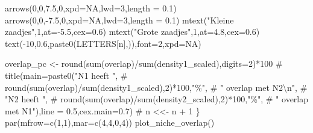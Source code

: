 \documentclass[
  a4paper,
]{scrbook}
\newenvironment{Shaded}{\begin{snugshade}}{\end{snugshade}}
\newcommand{\AttributeTok}[1]{\textcolor[rgb]{0.40,0.45,0.13}{#1}}
\newcommand{\CommentTok}[1]{\textcolor[rgb]{0.37,0.37,0.37}{#1}}
\newcommand{\ConstantTok}[1]{\textcolor[rgb]{0.56,0.35,0.01}{#1}}
\newcommand{\DecValTok}[1]{\textcolor[rgb]{0.68,0.00,0.00}{#1}}
\newcommand{\FloatTok}[1]{\textcolor[rgb]{0.68,0.00,0.00}{#1}}
\newcommand{\FunctionTok}[1]{\textcolor[rgb]{0.28,0.35,0.67}{#1}}
\newcommand{\NormalTok}[1]{\textcolor[rgb]{0.00,0.23,0.31}{#1}}
\newcommand{\OtherTok}[1]{\textcolor[rgb]{0.00,0.23,0.31}{#1}}
\newcommand{\SpecialCharTok}[1]{\textcolor[rgb]{0.37,0.37,0.37}{#1}}
\newcommand{\StringTok}[1]{\textcolor[rgb]{0.13,0.47,0.30}{#1}}
\theoremstyle{definition}
\theoremstyle{remark}
\begin{document}
\begin{Shaded}
\begin{Highlighting}[]
  \FunctionTok{arrows}\NormalTok{(}\DecValTok{0}\NormalTok{,}\DecValTok{0}\NormalTok{,}\FloatTok{7.5}\NormalTok{,}\DecValTok{0}\NormalTok{,}\AttributeTok{xpd=}\ConstantTok{NA}\NormalTok{,}\AttributeTok{lwd=}\DecValTok{3}\NormalTok{,}\AttributeTok{length =} \FloatTok{0.1}\NormalTok{)}
  \FunctionTok{arrows}\NormalTok{(}\DecValTok{0}\NormalTok{,}\DecValTok{0}\NormalTok{,}\SpecialCharTok{{-}}\FloatTok{7.5}\NormalTok{,}\DecValTok{0}\NormalTok{,}\AttributeTok{xpd=}\ConstantTok{NA}\NormalTok{,}\AttributeTok{lwd=}\DecValTok{3}\NormalTok{,}\AttributeTok{length =} \FloatTok{0.1}\NormalTok{)}
  \FunctionTok{mtext}\NormalTok{(}\StringTok{"Kleine zaadjes"}\NormalTok{,}\DecValTok{1}\NormalTok{,}\AttributeTok{at=}\SpecialCharTok{{-}}\FloatTok{5.5}\NormalTok{,}\AttributeTok{cex=}\FloatTok{0.6}\NormalTok{)}
  \FunctionTok{mtext}\NormalTok{(}\StringTok{"Grote zaadjes"}\NormalTok{,}\DecValTok{1}\NormalTok{,}\AttributeTok{at=}\FloatTok{4.8}\NormalTok{,}\AttributeTok{cex=}\FloatTok{0.6}\NormalTok{)}
  \FunctionTok{text}\NormalTok{(}\SpecialCharTok{{-}}\DecValTok{10}\NormalTok{,}\FloatTok{0.6}\NormalTok{,}\FunctionTok{paste0}\NormalTok{(LETTERS[n],}\StringTok{\textquotesingle{})\textquotesingle{}}\NormalTok{),}\AttributeTok{font=}\DecValTok{2}\NormalTok{,}\AttributeTok{xpd=}\ConstantTok{NA}\NormalTok{)}
  
\NormalTok{  overlap\_pc }\OtherTok{\textless{}{-}} \FunctionTok{round}\NormalTok{(}\FunctionTok{sum}\NormalTok{(overlap)}\SpecialCharTok{/}\FunctionTok{sum}\NormalTok{(density1\_scaled),}\AttributeTok{digits=}\DecValTok{2}\NormalTok{)}\SpecialCharTok{*}\DecValTok{100}
\CommentTok{\#   title(main=paste0("N1 heeft ", }
\CommentTok{\#                     round(sum(overlap)/sum(density1\_scaled),2)*100,"\%",}
\CommentTok{\#                     " overlap met N2\textbackslash{}n",}
\CommentTok{\#                     "N2 heeft ", }
\CommentTok{\#                     round(sum(overlap)/sum(density2\_scaled),2)*100,"\%",}
\CommentTok{\#                     " overlap met N1"),line = 0.5,cex.main=0.7)}
\CommentTok{\#   n \textless{}\textless{}{-} n + 1}
\NormalTok{\}}
\FunctionTok{par}\NormalTok{(}\AttributeTok{mfrow=}\FunctionTok{c}\NormalTok{(}\DecValTok{1}\NormalTok{,}\DecValTok{1}\NormalTok{),}\AttributeTok{mar=}\FunctionTok{c}\NormalTok{(}\DecValTok{4}\NormalTok{,}\DecValTok{4}\NormalTok{,}\DecValTok{0}\NormalTok{,}\DecValTok{4}\NormalTok{))}
\FunctionTok{plot\_niche\_overlap}\NormalTok{()}
\end{Highlighting}
\end{Shaded}
\end{document}
